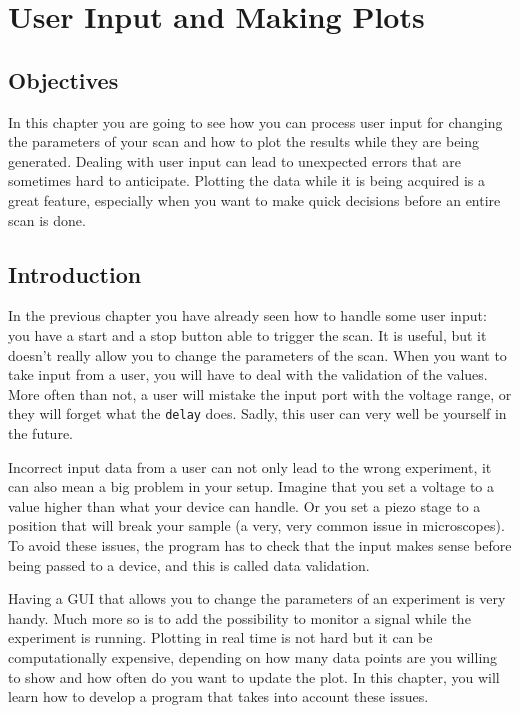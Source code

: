 \chapter{User Input and Making Plots}\label{user-input-and-makingplots}

\section{Objectives}
In this chapter you are going to see how you can process user input for
changing the parameters of your scan and how to plot the results while
they are being generated. Dealing with user input can lead to unexpected
errors that are sometimes hard to anticipate. Plotting the data while it
is being acquired is a great feature, especially when you want to make
quick decisions before an entire scan is done.

\section{Introduction}
In the previous chapter you have already seen how to handle some user
input: you have a start and a stop button able to trigger the scan. It
is useful, but it doesn't really allow you to change the parameters of
the scan. When you want to take input from a user, you will have to deal
with the validation of the values. More often than not, a user will
mistake the input port with the voltage range, or they will forget what
the \texttt{delay} does. Sadly, this user can very well be yourself in
the future.

Incorrect input data from a user can not only lead to the wrong
experiment, it can also mean a big problem in your setup. Imagine that
you set a voltage to a value higher than what your device can handle. Or
you set a piezo stage to a position that will break your sample (a very,
very common issue in microscopes). To avoid these issues, the program
has to check that the input makes sense before being passed to a device,
and this is called data validation.

Having a {GUI} that allows you to change the parameters of an experiment
is very handy. Much more so is to add the possibility to monitor a
signal while the experiment is running. Plotting in real time is not
hard but it can be computationally expensive, depending on how many data
points are you willing to show and how often do you want to update the
plot. In this chapter, you will learn how to develop a program that
takes into account these issues.

